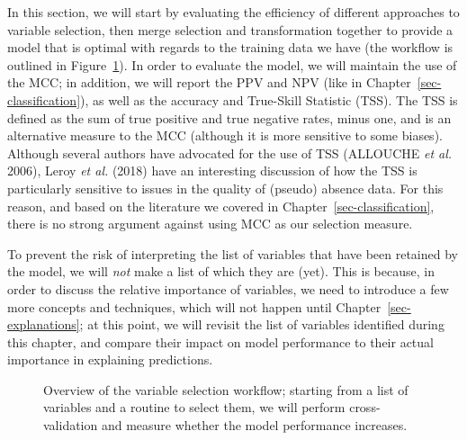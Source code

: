 \documentclass[
  letterpaper,
]{scrbook}
\begin{document}
In this section, we will start by evaluating the efficiency of different
approaches to variable selection, then merge selection and
transformation together to provide a model that is optimal with regards
to the training data we have (the workflow is outlined in
Figure~\ref{fig-predictors-workflow}). In order to evaluate the model,
we will maintain the use of the MCC; in addition, we will report the PPV
and NPV (like in Chapter~\ref{sec-classification}), as well as the
accuracy and True-Skill Statistic (TSS). The TSS is defined as the sum
of true positive and true negative rates, minus one, and is an
alternative measure to the MCC (although it is more sensitive to some
biases). Although several authors have advocated for the use of TSS
(ALLOUCHE \emph{et al.} 2006), Leroy \emph{et al.} (2018) have an
interesting discussion of how the TSS is particularly sensitive to
issues in the quality of (pseudo) absence data. For this reason, and
based on the literature we covered in Chapter~\ref{sec-classification},
there is no strong argument against using MCC as our selection measure.


To prevent the risk of interpreting the list of variables that have been
retained by the model, we will \emph{not} make a list of which they are
(yet). This is because, in order to discuss the relative importance of
variables, we need to introduce a few more concepts and techniques,
which will not happen until Chapter~\ref{sec-explanations}; at this
point, we will revisit the list of variables identified during this
chapter, and compare their impact on model performance to their actual
importance in explaining predictions.

\begin{figure}[pbt]


\caption{\label{fig-predictors-workflow}Overview of the variable
selection workflow; starting from a list of variables and a routine to
select them, we will perform cross-validation and measure whether the
model performance increases.}

\end{figure}%
\end{document}
